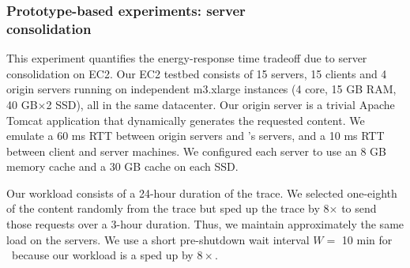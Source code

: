 %



\subsubsection{Prototype-based experiments: server\\ consolidation}
\label{sec:ec2}
\vspace{-0.1in}
This experiment quantifies the energy-response time tradeoff due to server consolidation on EC2. Our EC2 testbed consists of 15 servers, 15 clients and 4 origin servers running on independent m3.xlarge instances (4 core, 15 GB RAM, 40 GB$\times$2 SSD), all in the same datacenter. Our origin server is a trivial Apache Tomcat application that dynamically generates the requested content. We emulate a 60 ms RTT between origin servers and \cdc's servers, and a 10 ms RTT between client and server machines. We configured each server to use an 8 GB memory cache and a 30 GB cache on each SSD. 

Our workload consists of a 24-hour duration of the trace.  We selected one-eighth of the content randomly from the trace but sped up the trace by 8$\times$ to send those requests over a 3-hour duration. Thus, we  maintain approximately the same load on the servers. We use a short pre-shutdown wait interval $W =$ 10 min for \shrink\ because our workload is a sped up by $8\times$.


